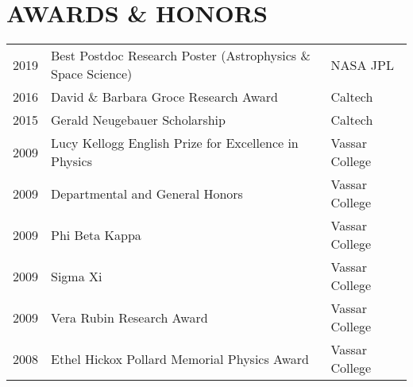 \section{\large AWARDS \& HONORS}
\begin{tabular}{lll}
2019 & Best Postdoc Research Poster (Astrophysics \& Space Science) & NASA JPL \\
2016 & David \& Barbara Groce Research Award & Caltech \\
2015 & Gerald Neugebauer Scholarship & Caltech \\
2009 & Lucy Kellogg English Prize for Excellence in Physics & Vassar College \\
2009 & Departmental and General Honors & Vassar College \\
2009 & Phi Beta Kappa & Vassar College \\
2009 & Sigma Xi & Vassar College \\
2009 & Vera Rubin Research Award & Vassar College \\
2008 & Ethel Hickox Pollard Memorial Physics Award & Vassar College \\
\end{tabular}